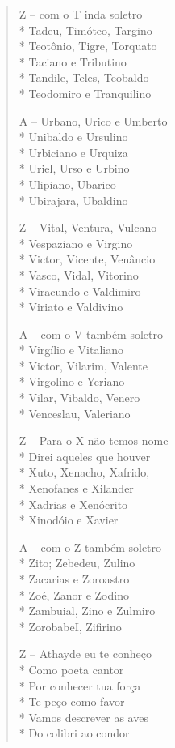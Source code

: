 \begin{verse}
Z -- com o T inda soletro\\*
Tadeu, Timóteo, Targino\\*
Teotônio, Tigre, Torquato\\*
Taciano e Tributino\\*
Tandile, Teles, Teobaldo\\*
Teodomiro e Tranquilino

A -- Urbano, Urico e Umberto\\*
Unibaldo e Ursulino\\*
Urbiciano e Urquiza\\*
Uriel, Urso e Urbino\\*
Ulipiano, Ubarico\\*
Ubirajara, Ubaldino

Z -- Vital, Ventura, Vulcano\\*
Vespaziano e Virgino\\*
Victor, Vicente, Venâncio\\*
Vasco, Vidal, Vitorino\\*
Viracundo e Valdimiro\\*
Viriato e Valdivino

A -- com o V também soletro\\*
Virgílio e Vitaliano\\*
Victor, Vilarim, Valente\\*
Virgolino e Yeriano\\*
Vilar, Vibaldo, Venero\\*
Venceslau, Valeriano

Z -- Para o X não temos nome\\*
Direi aqueles que houver\\*
Xuto, Xenacho, Xafrido,\\*
Xenofanes e Xilander\\*
Xadrias e Xenócrito\\*
Xinodóio e Xavier

A -- com o Z também soletro\\*
Zito; Zebedeu, Zulino\\*
Zacarias e Zoroastro\\*
Zoé, Zanor e Zodino\\*
Zambuial, Zino e Zulmiro\\*
ZorobabeI, Zifirino

Z -- Athayde eu te conheço\\*
Como poeta cantor\\*
Por conhecer tua força\\*
Te peço como favor\\*
Vamos descrever as aves\\*
Do colibri ao condor


\end{verse}
